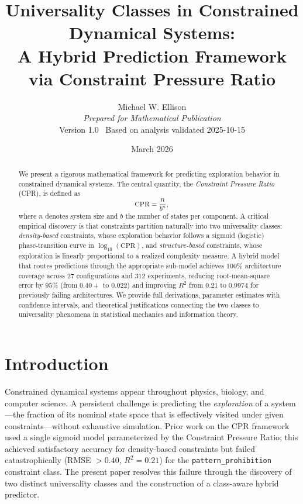 \documentclass[12pt,a4paper]{article}
\title{\textbf{Universality Classes in Constrained Dynamical Systems:\\
A Hybrid Prediction Framework via Constraint Pressure Ratio}}
\author{Michael W. Ellison\\
\textit{Prepared for Mathematical Publication}\\[0.5em]
\small Version 1.0 \quad \textdagger\ Based on analysis validated 2025-10-15}
\date{March 2026}
\begin{document}
\maketitle

\begin{abstract}
We present a rigorous mathematical framework for predicting exploration behavior in constrained dynamical systems. The central quantity, the \emph{Constraint Pressure Ratio} (CPR), is defined as
\[
    \mathrm{CPR} = \frac{n}{b^{n}},
\]
where $n$ denotes system size and $b$ the number of states per component. A critical empirical discovery is that constraints partition naturally into two universality classes: \emph{density-based} constraints, whose exploration behavior follows a sigmoid (logistic) phase-transition curve in $\log_{10}(\text{CPR})$, and \emph{structure-based} constraints, whose exploration is linearly proportional to a realized complexity measure. A hybrid model that routes predictions through the appropriate sub-model achieves $100\%$ architecture coverage across $27$ configurations and $312$ experiments, reducing root-mean-square error by $95\%$ (from $0.40+$ to $0.022$) and improving $R^{2}$ from $0.21$ to $0.9974$ for previously failing architectures. We provide full derivations, parameter estimates with confidence intervals, and theoretical justifications connecting the two classes to universality phenomena in statistical mechanics and information theory.
\end{abstract}

\tableofcontents
\newpage

\section{Introduction}

Constrained dynamical systems appear throughout physics, biology, and computer science. A persistent challenge is predicting the \emph{exploration} of a system---the fraction of its nominal state space that is effectively visited under given constraints---without exhaustive simulation. Prior work on the CPR framework used a single sigmoid model parameterized by the Constraint Pressure Ratio; this achieved satisfactory accuracy for density-based constraints but failed catastrophically (RMSE $>0.40$, $R^{2}=0.21$) for the \texttt{pattern\_prohibition} constraint class. The present paper resolves this failure through the discovery of two distinct universality classes and the construction of a class-aware hybrid predictor.
\end{document}
